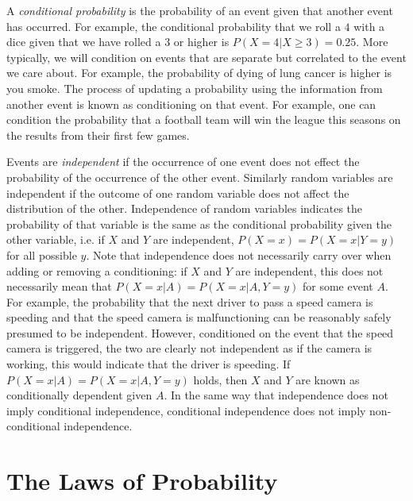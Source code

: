A \emph{conditional probability} is the probability of an event given that another event has occurred.
For example, the conditional probability that we roll a $4$ with a dice given that we have rolled a $3$ or
higher is $P(X=4 | X\ge3) = 0.25$.  More typically, we will condition on events that are separate but
correlated to the event we care about.  For example, the probability of dying of lung cancer is higher
is you smoke.  The process of updating a probability using the information from another event is
known as conditioning on that event.  For example, one can condition the probability that a football team
will win the league this seasons on the results from their first few games.

Events are \emph{independent} if the occurrence of one event does not effect the probability of 
the occurrence of the other event.  Similarly random variables are independent if the outcome of
one random variable does not affect the distribution of the other.  Independence of random variables
indicates the probability of that variable is the same as the conditional probability given the other
variable, i.e. if $X$ and $Y$ are independent, $P(X=x)=P(X=x|Y=y)$ for all possible $y$.  Note that 
independence does not necessarily carry over when adding or removing a conditioning:
if $X$ and $Y$ are independent, this does not necessarily mean that $P(X=x|A) = P(X=x|A,Y=y)$
for some event $A$.  For example, the probability that the next driver to pass a speed camera
is speeding and that the speed camera is
malfunctioning can be reasonably safely presumed to be independent.  However, conditioned on the
event that the speed camera is triggered, the two are clearly not independent as if the camera is working,
this would indicate that the driver is speeding.
If $P(X=x|A) = P(X=x|A,Y=y)$ holds, then $X$ and
$Y$ are known as conditionally dependent given $A$.  In the same way that independence does not
imply conditional independence, conditional independence does not imply non-conditional independence.

\section{The Laws of Probability}
\label{sec:prob:laws}

